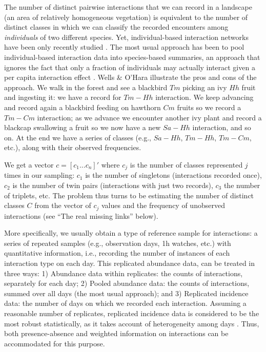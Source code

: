 \documentclass[12pt]{article}
\begin{document}
The number of distinct pairwise interactions that we can record in a landscape (an area of relatively homogeneous vegetation) is equivalent to the number of distinct classes in which we can classify the recorded encounters among \emph{individuals} of two different species. Yet, individual-based interaction networks have been only recently studied \citep{Dupont:2011aa,Wells:2012dy}. The most usual approach has been to pool individual-based interaction data into species-based summaries, an approach that ignores the fact that only a fraction of individuals may actually interact given a per capita interaction effect \citep{Wells:2012dy}. Wells \& O'Hara \citeyearpar{Wells:2012dy} illustrate the pros and cons of the approach. We walk in the forest and see a blackbird $Tm$ picking an ivy $Hh$ fruit and ingesting it: we have a record for $Tm-Hh$ interaction. We keep advancing and record again a blackbird feeding on hawthorn $Cm$ fruits so we record a $Tm-Cm$ interaction; as we advance we encounter another ivy plant and record a blackcap swallowing a fruit so we now have a new $Sa-Hh$ interaction, and so on. At the end we have a series of classes (e.g., $Sa-Hh$, $Tm-Hh$, $Tm-Cm$, etc.), along with their observed frequencies. 

We get a vector $c= [c_1 ... c_n]'$ where $c_j$ is the number of classes represented $j$ times in our sampling: $c_1$ is the number of singletons (interactions recorded once), $c_2$ is the number of twin pairs (interactions with just two records), $c_3$ the number of triplets, etc. The problem thus turns to be estimating the number of distinct classes $C$ from the vector of $c_j$ values and the frequency of unobserved interactions (see ``The real missing links'' below). 

More specifically, we usually obtain a type of reference sample \citep{Chao:2014wm} for interactions: a series of repeated samples (e.g., observation days, 1h watches, etc.) with quantitative information, i.e., recording the number of instances of each interaction type on each day. This replicated abundance data, can be treated in three ways: 1) Abundance data within replicates: the counts of interactions, separately for each day; 2) Pooled abundance data: the counts of interactions, summed over all days (the most usual approach); and 3) Replicated incidence data: the number of days on which we recorded each interaction. Assuming a reasonable number of replicates, replicated incidence data is considered to be the most robust statistically, as it takes account of heterogeneity among days \citep{Colwell:2004fi,Colwell:2012fc,Chao:2014wm}. Thus, both presence-absence and weighted information on interactions can be accommodated for this purpose. 
\end{document}

